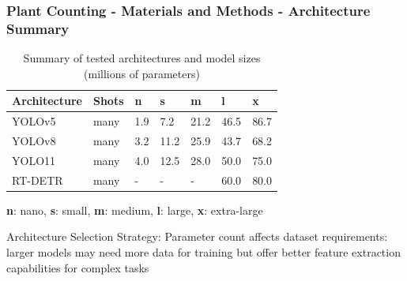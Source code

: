 \documentclass[aspectratio=43]{beamer}
\begin{document}
\begin{frame}
    \frametitle{\small Plant Counting - Materials and Methods - Architecture Summary}
    
    \begin{table}[H]
        \scriptsize
        \caption{Summary of tested architectures and model sizes (millions of parameters)}
        \begin{tabularx}{\textwidth}{lXXXXXX}
        \toprule
        \textbf{Architecture} &\textbf{Shots} & \textbf{n} & \textbf{s} & \textbf{m} & \textbf{l} & \textbf{x} \\
        \midrule
        YOLOv5 & many & 1.9 & 7.2 & 21.2 & 46.5 & 86.7 \\
        YOLOv8 & many & 3.2 & 11.2 & 25.9 & 43.7 & 68.2 \\
        YOLO11 & many & 4.0 & 12.5 & 28.0 & 50.0 & 75.0 \\
        RT-DETR & many & - & - & - & 60.0 & 80.0 \\
        \bottomrule
        \end{tabularx}
    \end{table}
    
        \scriptsize
        \textbf{n}: nano, \textbf{s}: small, \textbf{m}: medium, \textbf{l}: large, \textbf{x}: extra-large

    
    \begin{alertblock}{Architecture Selection Strategy:}
        \small
        Parameter count affects dataset requirements: larger models may need more data for training but offer better feature extraction capabilities for complex tasks
    \end{alertblock}
\end{frame}
\end{document}
